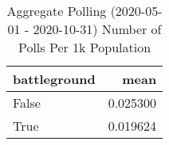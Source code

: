 \begin{table}
\centering
\caption{Aggregate Polling (2020-05-01 - 2020-10-31) Number of Polls Per 1k Population}
\label{table:aggregate\_polling\_2020-05-01\_-\_2020-10-31\_number\_of\_polls\_per\_1k\_population}
\begin{tabular}{lr}
\toprule
 battleground &      mean \\
\midrule
        False &  0.025300 \\
         True &  0.019624 \\
\bottomrule
\end{tabular}
\end{table}
